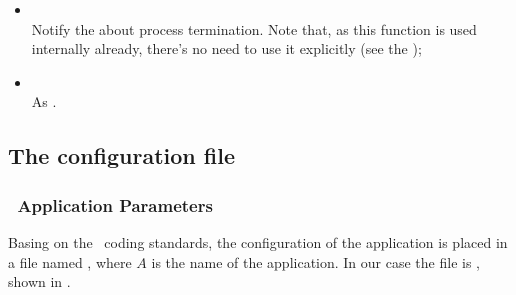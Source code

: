 \begin{enumerate}
\begin{itemize}
                \item {} \\
                    Notify the  about process termination.
                    Note that, as this function is used internally
                    already, there's no need to use it explicitly
                    (see the );

                \item {} \\
                    As .

                \end{itemize}
        \end{enumerate}


\subsection{The configuration file} \label{sub:ConfigurationFile}

\subsubsection{\YUNA\ Application Parameters}

Basing on the \Erlang\ coding standards, the configuration of the
application is placed in a file named , where $A$ is
the name of the application. In our case the file is ,
shown in .


